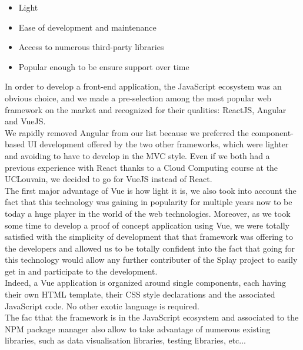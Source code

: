 \documentclass{eplmastersthesis}
\begin{document}
        \begin{itemize}
          \item Light
          \item Ease of development and maintenance
          \item Access to numerous third-party libraries
          \item Popular enough to be ensure support over time
        \end{itemize}

        In order to develop a front-end application, the JavaScript ecosystem
        was an obvious choice, and we made a pre-selection among the most
        popular web framework on the market and recognized for their qualities:
        ReactJS, Angular and VueJS.\\
        We rapidly removed Angular from our list because we preferred the
        component-based UI development offered by the two other frameworks,
        which were lighter and avoiding to have to develop in the MVC style.
        Even if we both had a previous experience with React thanks to a
        Cloud Computing course at the UCLouvain, we decided to go for VueJS
        instead of React.\\

        The first major advantage of Vue is how light it is, we also took into
        account the fact that this technology was gaining in popularity for
        multiple years now to be today a huge player in the world of the web
        technologies. Moreover, as we took some time to develop a proof
        of concept application using Vue, we were totally satisfied with the
        simplicity of development that that framework was offering to the
        developers and allowed us to be totally confident into the fact
        that going for this technology would allow any further contributer
        of the Splay project to easily get in and participate to the
        development.\\
        Indeed, a Vue application is organized around single components, each
        having their own HTML template, their CSS style declarations and
        the associated JavaScript code. No other exotic language is required.\\
        The fac tthat the framework is in the JavaScript ecosystem and
        associated to the NPM package manager also allow to take advantage of
        numerous existing libraries, such as data visualisation libraries,
        testing libraries, etc... \\
\end{document}
